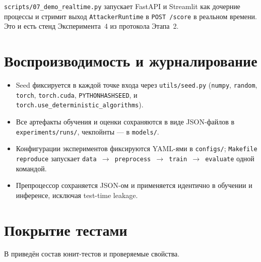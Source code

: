 \documentclass[14pt, a4paper]{extarticle}
\begin{document}
\texttt{scripts/07\_demo\_realtime.py} запускает FastAPI и Streamlit как
дочерние процессы и стримит выход \texttt{AttackerRuntime} в
\texttt{POST /score} в реальном времени. Это и есть стенд Эксперимента~4
из протокола Этапа~2.

\section{Воспроизводимость и журналирование}

\begin{itemize}
    \item Seed фиксируется в каждой точке входа через
    \texttt{utils/seed.py} (\texttt{numpy}, \texttt{random},
    \texttt{torch}, \texttt{torch.cuda}, \texttt{PYTHONHASHSEED}, и
    \texttt{torch.use\_deterministic\_algorithms}).
    \item Все артефакты обучения и оценки сохраняются в виде JSON-файлов
    в \texttt{experiments/runs/}, чекпойнты --- в \texttt{models/}.
    \item Конфигурации экспериментов фиксируются YAML-ями в
    \texttt{configs/}; \texttt{Makefile reproduce} запускает
    \texttt{data $\to$ preprocess $\to$ train $\to$ evaluate} одной
    командой.
    \item Препроцессор сохраняется JSON-ом и применяется идентично в
    обучении и инференсе, исключая test-time leakage.
\end{itemize}

\section{Покрытие тестами}

В  приведён состав юнит-тестов и проверяемые
свойства.
\end{document}
